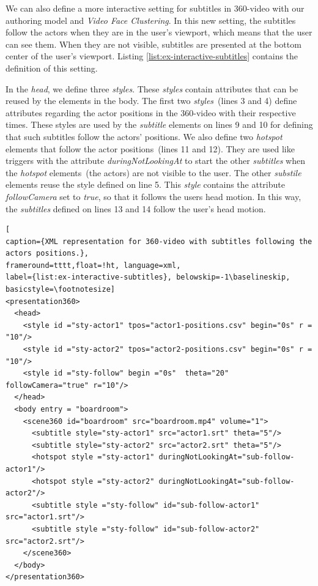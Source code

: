 We can also define a more interactive setting for subtitles in 360-video with our authoring model and \emph{Video Face Clustering}. In this new setting, the subtitles follow the actors when they are in the user's viewport, which means that the user can see them. When they are not visible, subtitles are presented at the bottom center of the user's viewport. Listing \ref{list:ex-interactive-subtitles} contains the definition of this setting. 

In the \emph{head}, we define three \emph{styles}. These \emph{styles} contain attributes that can be reused by the elements in the body. The first two \emph{styles}~(lines 3 and 4) define attributes regarding the actor positions in the 360-video with their respective times. These styles are used by the \emph{subtitle} elements on lines 9 and 10 for defining that such subtitles follow the actors' positions. We also define two \emph{hotspot} elements that follow the actor positions~(lines 11 and 12). They are used like triggers with the attribute \emph{duringNotLookingAt} to start the other \emph{subtitles} when the \emph{hotspot} elements~(the actors) are not visible to the user. The other \emph{substile} elements reuse the style defined on line 5. This \emph{style} contains the attribute \emph{followCamera} set to \emph{true}, so that it follows the users head motion. In this way, the \emph{subtitles} defined on lines 13 and 14 follow the user's head motion.


\begin{lstlisting}[
caption={XML representation for 360-video with subtitles following the actors positions.},
frameround=tttt,float=!ht, language=xml, 
label={list:ex-interactive-subtitles}, belowskip=-1\baselineskip, basicstyle=\footnotesize]
<presentation360>
  <head>
    <style id ="sty-actor1" tpos="actor1-positions.csv" begin="0s" r = "10"/>
    <style id ="sty-actor2" tpos="actor2-positions.csv" begin="0s" r = "10"/>
    <style id ="sty-follow" begin ="0s"  theta="20" followCamera="true" r="10"/>
  </head>
  <body entry = "boardroom">
    <scene360 id="boardroom" src="boardroom.mp4" volume="1">      
      <subtitle style="sty-actor1" src="actor1.srt" theta="5"/>      
      <subtitle style="sty-actor2" src="actor2.srt" theta="5"/>
      <hotspot style ="sty-actor1" duringNotLookingAt="sub-follow-actor1"/>
      <hotspot style ="sty-actor2" duringNotLookingAt="sub-follow-actor2"/>
      <subtitle style ="sty-follow" id="sub-follow-actor1" src="actor1.srt"/>
      <subtitle style ="sty-follow" id="sub-follow-actor2" src="actor2.srt"/>
    </scene360>
  </body>
</presentation360>
\end{lstlisting}

